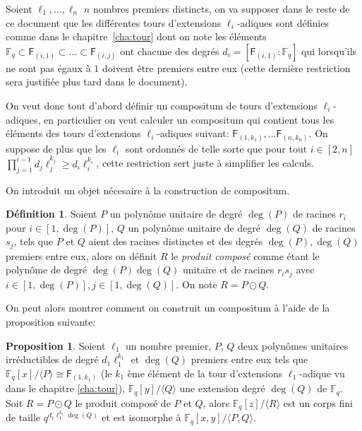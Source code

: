 \documentclass[10pt,a4paper]{book}
\theoremstyle{plain}
\theoremstyle{definition}
\theoremstyle{definition}
\theoremstyle{definition}
\newtheorem{prop}[thm]{Proposition}
\theoremstyle{definition}
\newtheorem{defi}[thm]{Définition}
\theoremstyle{remark}
\theoremstyle{remark}
\theoremstyle{definition}
\begin{document}
Soient $\ell_1, \dots, \ell_n$ $n$ nombres premiers distincts, 
on va supposer dans le reste de ce document que les différentes tours 
d'extensions $\ell_i$-adiques sont définies comme dans le 
chapitre~\ref{cha:tour} dont on note les éléments 
$\mathbb{F}_q \subset \mathsf{F}_{(i,1)} \subset \dots \subset  \mathsf{F}_{(i,j)}$ 
ont chacune des degrés $d_i=[\mathsf{F}_{(i,1)}:\mathbb{F}_q]$ qui lorsqu'ils 
ne sont pas égaux à $1$ doivent être premiers entre eux (cette dernière 
restriction sera justifiée plus tard dans le document).

On veut donc tout d'abord définir un compositum de tours d'extensions 
$\ell_i$-adiques, en particulier on veut calculer un compositum qui contient 
tous les éléments des tours d'extensions $\ell_i$-adiques suivant:
$\mathsf{F}_{(1,k_1)}, \dots \mathsf{F}_{(n,k_n)}$. On suppose de plus que les
$\ell_i$ sont ordonnés de telle sorte que pour tout $i \in [2,n]$ 
$\prod_{j=1}^{i-1}d_j\ell_j^{k_j} \geqslant d_i\ell_i^{k_i}$, cette restriction
sert juste à simplifier les calculs. 

On introduit un objet nécesaire à la construction de compositum.
\begin{defi}
Soient $P$ un polynôme unitaire de degré $\deg(P)$ de racines $r_i$ pour 
$i \in [1,\deg(P)]$, $Q$ un polynôme unitaire de degré $\deg(Q)$ de racines 
$s_j$, tels que $P$ et $Q$ aient des racines distinctes et des degrés $\deg(P),
\deg(Q)$ premiers entre eux, alors on définit $R$ le \emph{produit composé} 
comme étant le polynôme de degré $\deg(P)\deg(Q)$ unitaire et de racines 
$r_is_j$ avec $i \in [1,\deg(P)], j \in [1,\deg(Q)]$. On note $R= P\odot Q$.  
\end{defi}
On peut alors montrer comment on construit un compositum à l'aide de la 
proposition suivante: 
\begin{prop}
\label{pro:init:com}
Soient $\ell_1$ un nombre premier, $P$, $Q$ deux 
polynômes unitaires irréductibles de degré $d_1\ell_1^{k_1}$ et $\deg(Q)$ 
premiers entre eux tels que $\mathbb{F}_q[x]/\langle P \rangle \cong 
\mathsf{F}_{(1,k_1)}$ (le $k_1$ ème élément de la tour d'extensions 
$\ell_1$-adique vu dans le chapitre \ref{cha:tour}), $\mathbb{F}_q[y]/\langle Q 
\rangle$ une extension degré $\deg(Q)$ de $\mathbb{F}_q$.
 Soit $R=P\odot Q$  le produit composé de $P$ et $Q$, alors 
 $\mathbb{F}_q[z]/\langle R \rangle$ est un corps fini de taille 
 $q^{d_1\ell_1^{k_1}\deg(Q)}$ et est isomorphe à $\mathbb{F}_q[x,y]/
 \langle P,Q \rangle$.
\end{prop}
\end{document}
